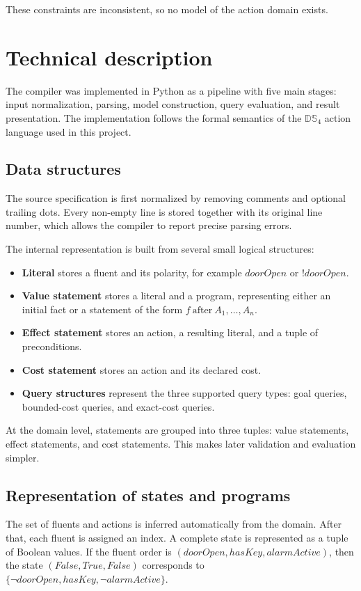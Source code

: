 \documentclass[11pt]{article}
\begin{document}
These constraints are inconsistent, so no model of the action domain exists.



\section{Technical description}
The compiler was implemented in Python as a pipeline with five main stages:
input normalization, parsing, model construction, query evaluation, and result
presentation. The implementation follows the formal semantics of the
\(\mathbb{DS}_{4}\) action language used in this project.

\subsection{Data structures}
The source specification is first normalized by removing comments and optional
trailing dots. Every non-empty line is stored together with its original line
number, which allows the compiler to report precise parsing errors.

The internal representation is built from several small logical structures:
\begin{itemize}
    \item \textbf{Literal} stores a fluent and its polarity, for example
    \(doorOpen\) or \(!doorOpen\).
    \item \textbf{Value statement} stores a literal and a program, representing
    either an initial fact or a statement of the form
    \(f ~\text{after}~ A_1,\ldots,A_n\).
    \item \textbf{Effect statement} stores an action, a resulting literal,
    and a tuple of preconditions.
    \item \textbf{Cost statement} stores an action and its declared cost.
    \item \textbf{Query structures} represent the three supported query types:
    goal queries, bounded-cost queries, and exact-cost queries.
\end{itemize}

At the domain level, statements are grouped into three tuples:
value statements, effect statements, and cost statements.
This makes later validation and evaluation simpler.

\subsection{Representation of states and programs}
The set of fluents and actions is inferred automatically from the domain.
After that, each fluent is assigned an index. A complete state is represented
as a tuple of Boolean values. If the fluent order is
\((doorOpen, hasKey, alarmActive)\), then the state
\((False, True, False)\) corresponds to
\(\{\neg doorOpen, hasKey, \neg alarmActive\}\).
\end{document}
